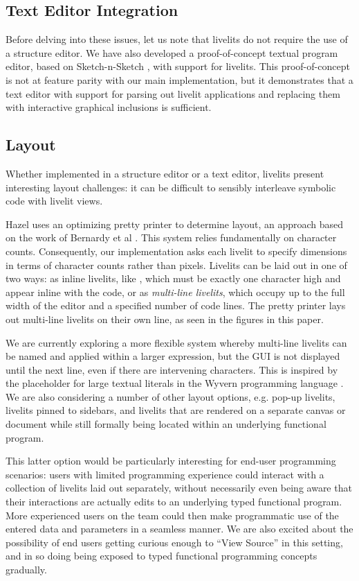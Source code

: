 \subsection{Text Editor Integration}
Before delving into these issues, let us note that livelits do not require the use of a structure editor. 
We have also developed a 
proof-of-concept textual program editor, based on Sketch-n-Sketch \cite{sns-pldi,sns-uist}, with support for livelits.
This proof-of-concept is not at feature parity with 
our main implementation, but it demonstrates that a text editor with support for 
parsing out livelit applications and replacing them with interactive graphical inclusions is sufficient.

\subsection{Layout}\label{sec:layout}
Whether implemented in a structure editor or a text editor, livelits present 
interesting layout challenges: it can be difficult to sensibly 
interleave symbolic code with livelit views. 

Hazel uses an optimizing pretty printer to determine layout, an approach 
based on the work of Bernardy et al . This system relies 
fundamentally on character counts. Consequently, our implementation asks each 
livelit to specify dimensions in terms of character counts rather than pixels.
Livelits can be laid out in one of two ways: as inline livelits, like ,
which must be exactly one character high and appear inline with the code,
or as \emph{multi-line livelits}, which occupy up to the full width of the editor 
and a specified number of code lines. The pretty printer lays out multi-line livelits
on their own line, as seen in the figures in this paper. 

We are currently exploring a more flexible system whereby 
multi-line livelits can be named and applied within a larger expression, but
the GUI is not displayed until the next line, even if there are intervening characters.
This is inspired by the \li{~} placeholder for large textual literals in the 
Wyvern programming language \cite{TSLs}. We are also considering a number of other layout 
options, e.g. pop-up livelits, livelits pinned to sidebars, and livelits that are rendered  
on a separate canvas or document while still formally being located within an underlying functional program. 

This latter option 
would be particularly interesting for end-user programming scenarios: users with limited
programming experience 
could interact with a collection of livelits laid out separately, without necessarily
even being aware that their interactions are actually edits to an underlying typed
functional program. More experienced users on the team could then make programmatic use of the entered
data and parameters in a seamless manner. We are also excited about the possibility of end users
getting curious enough to ``View Source'' in this setting, and in so doing 
being exposed to typed functional programming concepts gradually.

